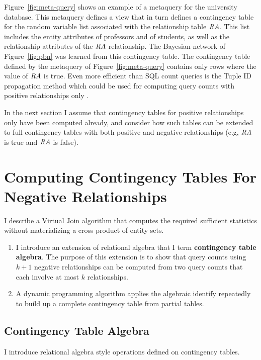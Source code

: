 \documentclass{sfuthesis}
\begin{document}
Figure~\ref{fig:meta-query} shows an example of a metaquery for the university database. This metaquery defines a view that in turn defines a contingency table for the random variable list associated with the relationship table $\mathit{RA}$. This list includes the entity attributes of professors and of students, as well as the relationship attributes of the $\mathit{RA}$ relationship. 
The Bayesian network of Figure~\ref{fig:pbn} was learned from this contingency table. 
The  contingency table defined by the metaquery of Figure~\ref{fig:meta-query} contains only rows where the value of $\mathit{RA}$ is true. 
Even more efficient than SQL count queries is the Tuple ID propagation method which could be used for computing query counts with positive relationships only \cite{Yin2004}. 

In the next section I  assume that contingency tables for positive relationships only have been computed already, and consider how such tables can be extended to full contingency tables with both positive and negative relationships (e.g, $\mathit{RA}$ is true  and $\mathit{RA}$ is  false). 



\section{Computing Contingency Tables For Negative Relationships} \label{sec:nag}

I  describe a Virtual Join algorithm that computes the required sufficient statistics without  materializing a cross product of entity sets. 
\begin{enumerate}
\item  I  introduce an  extension of relational algebra that I  term \textbf{contingency table algebra}. The purpose of this extension is to show that query counts using $k+1$ negative relationships can be computed from two query counts that each involve at most $k$ relationships. 
\item A dynamic programming algorithm applies the algebraic identify repeatedly to build up a complete contingency table from partial tables.
\end{enumerate}

\subsection{Contingency Table Algebra} \label{sec:cta}
I  introduce relational algebra style operations defined on contingency tables.
\end{document}
